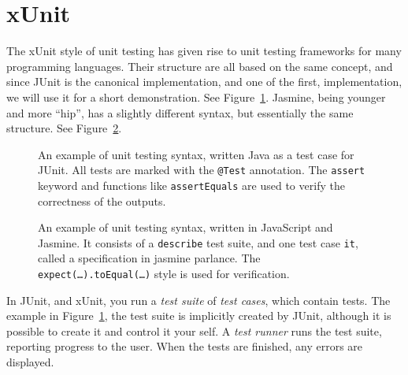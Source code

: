 \documentclass[a4paper,11pt]{kth-mag}
\begin{document}
\section{xUnit} \label{section-xunit}

The xUnit style of unit testing \cite{fowlerxunit} has given rise to unit
testing frameworks for many programming languages. Their structure are all
based on the same concept, and since JUnit is the canonical implementation, and
one of the first, implementation, we will use it for a short demonstration. See
Figure~\ref{figure-junit}. Jasmine, being younger and more ``hip'', has a
slightly different syntax, but essentially the same structure. See
Figure~\ref{figure-jasmine}.

\begin{figure}[h!]
	\begin{center}
	\begin{minipage}{0.9\textwidth}
		\lstset{language=Java}
		
	\end{minipage}
	\end{center}
  \caption{An example of unit testing syntax, written Java as a test case for
    JUnit. All tests are marked with the \texttt{@Test} annotation. The
    \texttt{assert} keyword and functions like \texttt{assertEquals} are used
    to verify the correctness of the outputs.}
	\label{figure-junit}
\end{figure}

\begin{figure}[h!]
	\begin{center}
	\begin{minipage}{0.9\textwidth}
		\lstset{language=JavaScript}
		
	\end{minipage}
	\end{center}
  \caption{An example of unit testing syntax, written in JavaScript and
    Jasmine. It consists of a \texttt{describe} test suite, and one test case
    \texttt{it}, called a specification in jasmine parlance. The
    \texttt{expect(\dots).toEqual(\dots)} style is used for verification.}
	\label{figure-jasmine}
\end{figure}

In JUnit, and xUnit, you run a \textit{test suite} of \textit{test cases},
which contain tests. The example in Figure~\ref{figure-junit}, the test suite
is implicitly created by JUnit, although it is possible to create it and
control it your self. A \textit{test runner} runs the test suite, reporting
progress to the user. When the tests are finished, any errors are displayed.
\end{document}
